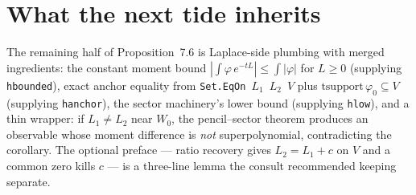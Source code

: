 \documentclass[11pt]{article}
\newcommand{\code}[1]{\texttt{#1}}
\begin{document}
\section{What the next tide inherits}

The remaining half of Proposition~7.6 is Laplace-side plumbing with
merged ingredients: the constant moment bound
$|\int \varphi\, e^{-tL}| \le \int |\varphi|$ for $L \ge 0$
(supplying \code{hbounded}), exact anchor equality from
\code{Set.EqOn}~$L_1$~$L_2$~$V$ plus
$\mathrm{tsupport}\,\varphi_0 \subseteq V$ (supplying
\code{hanchor}), the sector machinery's lower bound (supplying
\code{hlow}), and a thin wrapper: if $L_1 \ne L_2$ near $W_0$, the
pencil--sector theorem produces an observable whose moment
difference is \emph{not} superpolynomial, contradicting the
corollary. The optional preface --- ratio recovery gives
$L_2 = L_1 + c$ on $V$ and a common zero kills $c$ --- is a
three-line lemma the consult recommended keeping separate.
\end{document}
